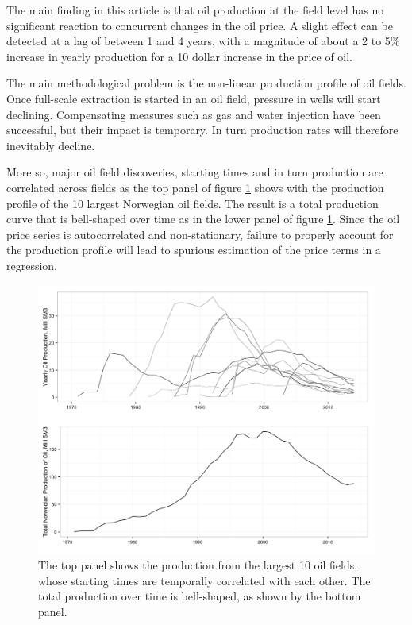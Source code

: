 \documentclass[12pt]{article}
\begin{document}
The main finding in this article is that oil production at the field level has no significant reaction to concurrent changes in the oil price.  A slight effect can be detected at a lag of between 1 and 4 years, with a magnitude of about a 2 to 5\% increase in yearly production for a 10 dollar increase in the price of oil.  


The main methodological problem is the non-linear production profile of oil fields.  Once full-scale extraction is started in an oil field, pressure in wells will start declining. Compensating measures such as gas and water injection have been successful, but their impact is temporary. In turn production rates will therefore inevitably decline.

More so, major oil field discoveries, starting times and in turn production are correlated across fields as the top panel of figure \ref{oil_decline} shows with the production profile of the 10 largest Norwegian oil fields.  The result is a total production curve that is bell-shaped over time as in the lower panel of figure \ref{oil_decline}.  Since the oil price series is autocorrelated and non-stationary, failure to properly account for the production profile will lead to spurious estimation of the price terms in a regression.

\begin{figure}
	\includegraphics[width=1\textwidth]{figures/oil_decline.png}
	\caption{The top panel shows the production from the largest 10 oil fields, whose starting times are temporally correlated with each other.  The total production over time is bell-shaped, as shown by the bottom panel.}
	\label{oil_decline}
\end{figure}
\end{document}
